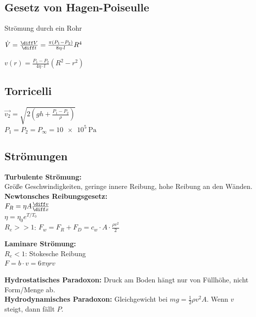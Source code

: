 \documentclass[german]{latex4ei/latex4ei_sheet}
\begin{document}
\begin{sectionbox}
\subsection{Gesetz von Hagen-Poiseulle}
Strömung durch ein Rohr\\
\begin{emphbox}
$\dot{V}=\frac{\diff V}{\diff t}=\frac{\pi (P_1-P_2)}{8\eta \cdot l}R^4$\\
\end{emphbox}
$v(r)=\frac{P_1-P_2}{4\eta \cdot l}(R^2-r^2)$
\end{sectionbox}
\begin{sectionbox}
\subsection{Torricelli}
$\vec{v_2}=\sqrt{2(gh+\frac{P_1-P_2}{\rho})}$\\
$P_1=P_2=P_\infty = \SI{10e5}{\pascal}$
\end{sectionbox}
\begin{sectionbox}
\subsection{Strömungen}
\begin{cookbox}{}
	\item \textbf{Turbulente Strömung:} \\
		Größe Geschwindigkeiten, geringe innere Reibung, hohe Reibung an den Wänden.\\
			\textbf{Newtonsches Reibungsgesetz:}\\
			$F_R=\eta A \frac{\diff v}{\diff x}$\\
			$\eta=\eta_0e^{T/T_0}$ \\
			$R_e >> 1$: $F_w=F_R+F_D=c_w \cdot A \cdot \frac{\rho v^2}{2}$
	\item \textbf{Laminare Strömung:} \\
			$R_e<1$: Stokesche Reibung\\
			$F=b\cdot v = 6\pi \eta r v$
\end{cookbox}
\textbf{Hydrostatisches Paradoxon:} Druck am Boden hängt nur von Füllhöhe, nicht Form/Menge ab.\\
\textbf{Hydrodynamisches Paradoxon:} Gleichgewicht bei $mg=\frac{1}{2}\rho v^2 A$. Wenn $v$ steigt, dann fällt $P$.
\end{sectionbox}

\end{document}
